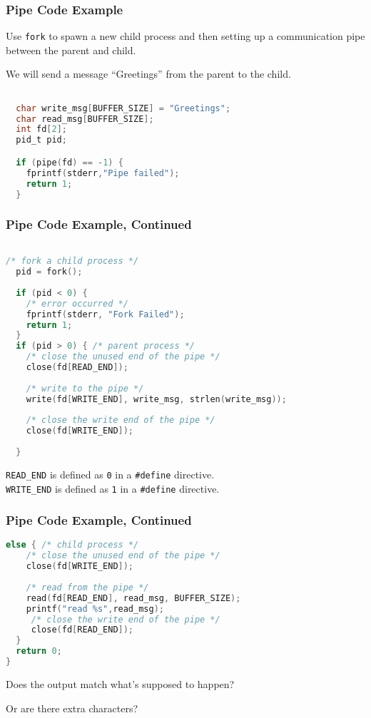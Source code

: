 \begin{frame}[fragile]
	\frametitle{Pipe Code Example}

	Use \texttt{fork} to spawn a new child process and then setting up a communication pipe between the parent and child.

	We will send a message ``Greetings'' from the parent to the child.

	\begin{lstlisting}[language=C]

  char write_msg[BUFFER_SIZE] = "Greetings"; 
  char read_msg[BUFFER_SIZE];
  int fd[2];
  pid_t pid;

  if (pipe(fd) == -1) {
    fprintf(stderr,"Pipe failed");
    return 1;
  }

\end{lstlisting}


\end{frame}

\begin{frame}[fragile]
	\frametitle{Pipe Code Example, Continued}

	\begin{lstlisting}[language=C]

/* fork a child process */
  pid = fork();
  
  if (pid < 0) { 
    /* error occurred */ 
    fprintf(stderr, "Fork Failed"); 
    return 1;
  }
  if (pid > 0) { /* parent process */
    /* close the unused end of the pipe */ 
    close(fd[READ_END]);
    
    /* write to the pipe */
    write(fd[WRITE_END], write_msg, strlen(write_msg));
    
    /* close the write end of the pipe */
    close(fd[WRITE_END]);
    
  } 

\end{lstlisting}

	\texttt{READ\_END} is defined as \texttt{0} in a \texttt{\#define} directive.\\
	\texttt{WRITE\_END} is defined as \texttt{1} in a \texttt{\#define} directive.

\end{frame}

\begin{frame}[fragile]
	\frametitle{Pipe Code Example, Continued}


	\begin{lstlisting}[language=C]
  else { /* child process */
    /* close the unused end of the pipe */ 
    close(fd[WRITE_END]);
    
    /* read from the pipe */
    read(fd[READ_END], read_msg, BUFFER_SIZE); 
    printf("read %s",read_msg);
     /* close the write end of the pipe */
     close(fd[READ_END]); 
  }
  return 0;
}
\end{lstlisting}

	Does the output match what's supposed to happen?

	Or are there extra characters?

\end{frame}

